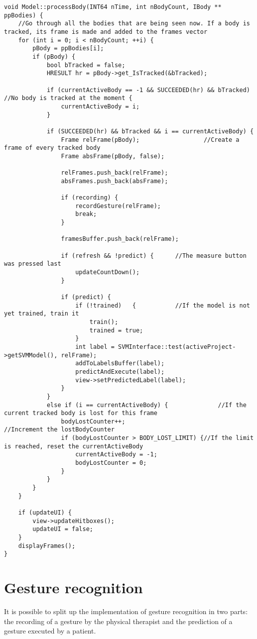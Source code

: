 \begin{lstlisting}[caption=the controlling method that is part of the back-end's main loop, label=code_process_body]
void Model::processBody(INT64 nTime, int nBodyCount, IBody ** ppBodies) {
	//Go through all the bodies that are being seen now. If a body is tracked, its frame is made and added to the frames vector
	for (int i = 0; i < nBodyCount; ++i) {
		pBody = ppBodies[i];
		if (pBody) {
			bool bTracked = false;
			HRESULT hr = pBody->get_IsTracked(&bTracked);

			if (currentActiveBody == -1 && SUCCEEDED(hr) && bTracked)	//No body is tracked at the moment {
				currentActiveBody = i;
			}

			if (SUCCEEDED(hr) && bTracked && i == currentActiveBody) {
				Frame relFrame(pBody);					//Create a frame of every tracked body
				Frame absFrame(pBody, false);

				relFrames.push_back(relFrame);
				absFrames.push_back(absFrame);
				
				if (recording) {
					recordGesture(relFrame);
					break;
				}

				framesBuffer.push_back(relFrame);

				if (refresh && !predict) {		//The measure button was pressed last
					updateCountDown();
				}

				if (predict) {
					if (!trained)	{			//If the model is not yet trained, train it
						train();
						trained = true;
					}
					int label = SVMInterface::test(activeProject->getSVMModel(), relFrame);
					addToLabelsBuffer(label);
					predictAndExecute(label);
					view->setPredictedLabel(label);
				}
			}
			else if (i == currentActiveBody) {				//If the current tracked body is lost for this frame
				bodyLostCounter++;											//Increment the lostBodyCounter
				if (bodyLostCounter > BODY_LOST_LIMIT) {//If the limit is reached, reset the currentActiveBody
					currentActiveBody = -1;
					bodyLostCounter = 0;
				}
			}
		}
	}

	if (updateUI) {
		view->updateHitboxes();
		updateUI = false;
	}
	displayFrames();
}
\end{lstlisting}


\section{Gesture recognition}

It is possible to split up the implementation of gesture recognition in two parts: the recording of a gesture by the physical therapist and the prediction of a gesture executed by a patient.


